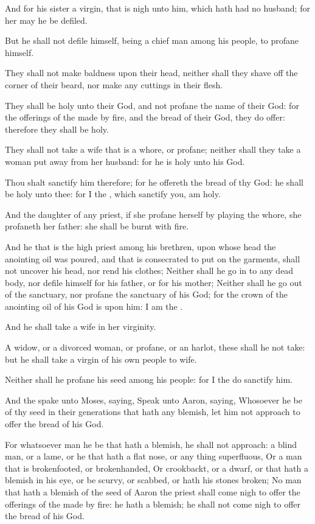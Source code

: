 \verse And for his sister a virgin, that is nigh unto him, which hath had no husband; for her may he be defiled.

\verse But he shall not defile himself, being a chief man among his people, to profane himself.

\verse They shall not make baldness upon their head, neither shall they shave off the corner of their beard, nor make any cuttings in their flesh.

\verse They shall be holy unto their God, and not profane the name of their God: for the offerings of the \LORD made by fire, and the bread of their God, they do offer: therefore they shall be holy.

\verse They shall not take a wife that is a whore, or profane; neither shall they take a woman put away from her husband: for he is holy unto his God.

\verse Thou shalt sanctify him therefore; for he offereth the bread of thy God: he shall be holy unto thee: for I the \LORD, which sanctify you, am holy.

\verse And the daughter of any priest, if she profane herself by playing the whore, she profaneth her father: she shall be burnt with fire.

\verse And he that is the high priest among his brethren, upon whose head the anointing oil was poured, and that is consecrated to put on the garments, shall not uncover his head, nor rend his clothes; \verse Neither shall he go in to any dead body, nor defile himself for his father, or for his mother; \verse Neither shall he go out of the sanctuary, nor profane the sanctuary of his God; for the crown of the anointing oil of his God is upon him: I am the \LORD.

\verse And he shall take a wife in her virginity.

\verse A widow, or a divorced woman, or profane, or an harlot, these shall he not take: but he shall take a virgin of his own people to wife.

\verse Neither shall he profane his seed among his people: for I the \LORD do sanctify him.

\verse And the \LORD spake unto Moses, saying, \verse Speak unto Aaron, saying, Whosoever he be of thy seed in their generations that hath any blemish, let him not approach to offer the bread of his God.

\verse For whatsoever man he be that hath a blemish, he shall not approach: a blind man, or a lame, or he that hath a flat nose, or any thing superfluous, \verse Or a man that is brokenfooted, or brokenhanded, \verse Or crookbackt, or a dwarf, or that hath a blemish in his eye, or be scurvy, or scabbed, or hath his stones broken; \verse No man that hath a blemish of the seed of Aaron the priest shall come nigh to offer the offerings of the \LORD made by fire: he hath a blemish; he shall not come nigh to offer the bread of his God.

